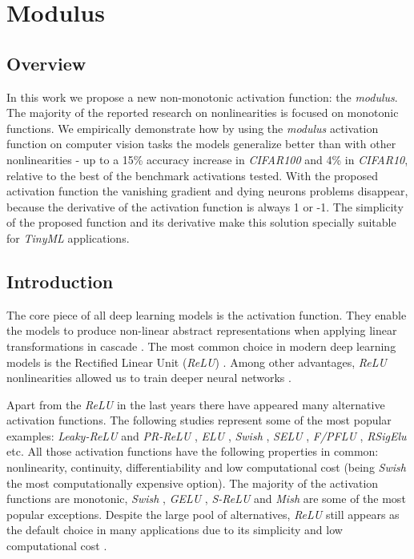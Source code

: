 \chapter{Modulus} \label{ch:modulus}

\section{Overview}
In this work we propose a new non-monotonic activation function: the \textit{modulus}. The majority of the reported research on nonlinearities is focused on monotonic functions. We empirically demonstrate how by using the \textit{modulus} activation function on computer vision tasks the models generalize better than with other nonlinearities - up to a 15\% accuracy increase in \textit{CIFAR100} and 4\% in \textit{CIFAR10}, relative to the best of the benchmark activations tested. With the proposed activation function the vanishing gradient and dying neurons problems disappear, because the derivative of the activation function is always 1 or -1. The simplicity of the proposed function and its derivative make this solution specially suitable for \textit{TinyML} applications. 

	

\section{Introduction}
The core piece of all deep learning models is the activation function. They enable the models to produce non-linear abstract representations when applying linear transformations in cascade \cite{goodfellow2016}. The most common choice in modern deep learning models is the Rectified Linear Unit (\textit{ReLU}) \cite{nair2010}. Among other advantages, \textit{ReLU} nonlinearities allowed us to train deeper neural networks \cite{xu2015}.

Apart from the \textit{ReLU} in the last years there have appeared many alternative activation functions. The following studies represent some of the most popular examples: \textit{Leaky-ReLU} and \textit{PR-ReLU} \cite{xu2015}, \textit{ELU} \cite{djork2016}, \textit{Swish} \cite{ramachandran2018}, \textit{SELU} \cite{klambauer2017}, \textit{F/PFLU} \cite{zhu2020}, \textit{RSigElu} \cite{Kilicarslan2021} etc. All those activation functions have the following properties in common: nonlinearity, continuity, differentiability and low computational cost (being \textit{Swish} the most computationally expensive option). The majority of the activation functions are monotonic, \textit{Swish} \cite{ramachandran2018}, \textit{GELU} \cite{hendrycks2016},  \textit{S-ReLU} \cite{Jin2016} and \textit{Mish} \cite{misra2019mish} are some of the most popular exceptions. Despite the large pool of alternatives, \textit{ReLU} still appears as the default choice in many applications due to its simplicity and low computational cost \cite{nair2010}.

